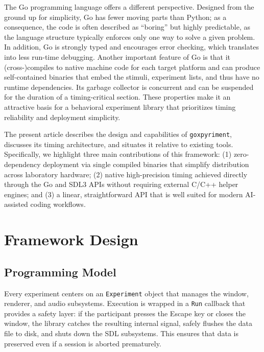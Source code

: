 \documentclass[man,a4paper]{apa7}
\begin{document}
The Go programming language \parencite{donovan2016} offers a different
perspective. Designed from the ground up for simplicity, Go has fewer
moving parts than Python; as a consequence, the code is often
described as ``boring'' but highly predictable, as the language
structure typically enforces only one way to solve a given problem. In
addition, Go is strongly typed and encourages error checking, which
translates into less run-time debugging. Another important feature of
Go is that it (cross-)compiles to native machine code for each target
platform and can produce self-contained binaries that embed the
stimuli, experiment lists, and thus have no runtime dependencies. Its
garbage collector is concurrent and can be suspended for the duration
of a timing-critical section. These properties make it an attractive
basis for a behavioral experiment library that prioritizes timing
reliability and deployment simplicity.

The present article describes the design and capabilities of
\texttt{goxpyriment}, discusses its timing architecture, and situates it
relative to existing tools. Specifically, we highlight three main contributions
of this framework: (1) zero-dependency deployment via single compiled binaries
that simplify distribution across laboratory hardware; (2) native high-precision
timing achieved directly through the Go and SDL3 APIs without requiring external
C/C++ helper engines; and (3) a linear, straightforward API that is well
suited for modern AI-assisted coding workflows.

{\small

\par}

\section{Framework Design}\label{framework-design}

\subsection{Programming Model}\label{programming-model}

Every experiment centers on an \texttt{Experiment} object that manages the
window, renderer, and audio subsystems. Execution is wrapped in a
\texttt{Run} callback that provides a safety layer: if the participant presses
the Escape key or closes the window, the library catches the resulting internal
signal, safely flushes the data file to disk, and shuts down the SDL
subsystems. This ensures that data is preserved even if a session is aborted
prematurely.
\end{document}
